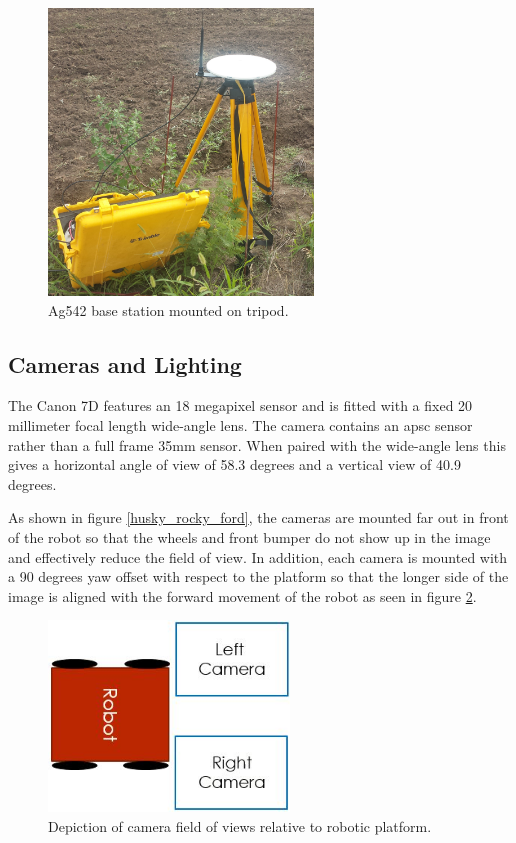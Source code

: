 \begin{figure}
	\centering
    \includegraphics[height=3in]{figures/sunflower_base_cropped.jpg}
    \caption[Base station with tripod]{Ag542 base station mounted on tripod.}
    \label{base_station}
\end{figure}

\subsection{Cameras and Lighting}

The Canon 7D features an 18 megapixel sensor and is fitted with a fixed 20 millimeter focal length wide-angle lens.  The camera contains an \ac{apsc} sensor rather than a full frame 35mm sensor. When paired with the wide-angle lens this gives a horizontal angle of view of 58.3 degrees and a vertical view of 40.9 degrees.
  
As shown in figure \ref{husky_rocky_ford}, the cameras are mounted far out in front of the robot so that the wheels and front bumper do not show up in the image and effectively reduce the field of view.  In addition, each camera is mounted with a 90 degrees yaw offset with respect to the platform so that the longer side of the image is aligned with the forward movement of the robot as seen in figure \ref{figure:image_fov}.  

\begin{figure}
	\centering
    \includegraphics[height=2in]{figures/camera_directions.jpg}
    \caption[Camera field of view]{Depiction of camera field of views relative to robotic platform.}
    \label{figure:image_fov}
\end{figure}

